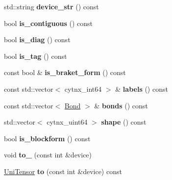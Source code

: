 \begin{DoxyCompactItemize}
std\+::string {\bfseries device\+\_\+str} () const
\item 
\mbox{\label{classcytnx_1_1UniTensor_a0b2eb7bd2d16f74c43f991c2f3a64fac}} 
bool {\bfseries is\+\_\+contiguous} () const
\item 
\mbox{\label{classcytnx_1_1UniTensor_a8de198d36f24c6e9d49b357632ec0c98}} 
bool {\bfseries is\+\_\+diag} () const
\item 
\mbox{\label{classcytnx_1_1UniTensor_a1c3cbcbe162042897fe77c9ce7632af2}} 
bool {\bfseries is\+\_\+tag} () const
\item 
\mbox{\label{classcytnx_1_1UniTensor_ac7cce8eac4dc054af70723faa9d3bcf0}} 
const bool \& {\bfseries is\+\_\+braket\+\_\+form} () const
\item 
\mbox{\label{classcytnx_1_1UniTensor_a38073b2e56a0902146951155841c85bf}} 
const std\+::vector$<$ cytnx\+\_\+int64 $>$ \& {\bfseries labels} () const
\item 
\mbox{\label{classcytnx_1_1UniTensor_abc8348e0f56e2479dbe45273c3055b1b}} 
const std\+::vector$<$ \hyperlink{classcytnx_1_1Bond}{Bond} $>$ \& {\bfseries bonds} () const
\item 
\mbox{\label{classcytnx_1_1UniTensor_a38e60453fd51add542acdc43c8558f24}} 
std\+::vector$<$ cytnx\+\_\+uint64 $>$ {\bfseries shape} () const
\item 
\mbox{\label{classcytnx_1_1UniTensor_aac44ae40cb93f11f673ac0c1930ae319}} 
bool {\bfseries is\+\_\+blockform} () const
\item 
\mbox{\label{classcytnx_1_1UniTensor_a9aa08f2c848cc7d31bceac7656b4a976}} 
void {\bfseries to\+\_\+} (const int \&device)
\item 
\mbox{\label{classcytnx_1_1UniTensor_a025f4a2d775a9892b7f86aeff364fa49}} 
\hyperlink{classcytnx_1_1UniTensor}{Uni\+Tensor} {\bfseries to} (const int \&device) const
\item 

\end{DoxyCompactItemize}
